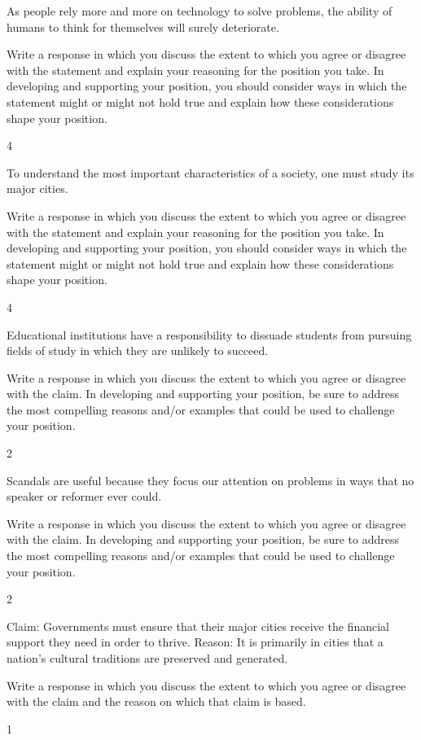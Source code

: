 \documentclass[]{article}
\begin{document}
As people rely more and more on technology to solve problems, the
ability of humans to think for themselves will surely deteriorate.

Write a response in which you discuss the extent to which you agree or
disagree with the statement and explain your reasoning for the position
you take. In developing and supporting your position, you should
consider ways in which the statement might or might not hold true and
explain how these considerations shape your position.

4

To understand the most important characteristics of a society, one must
study its major cities.

Write a response in which you discuss the extent to which you agree or
disagree with the statement and explain your reasoning for the position
you take. In developing and supporting your position, you should
consider ways in which the statement might or might not hold true and
explain how these considerations shape your position.

4

Educational institutions have a responsibility to dissuade students from
pursuing fields of study in which they are unlikely to succeed.

Write a response in which you discuss the extent to which you agree or
disagree with the claim. In developing and supporting your position, be
sure to address the most compelling reasons and/or examples that could
be used to challenge your position.

2

Scandals are useful because they focus our attention on problems in ways
that no speaker or reformer ever could.

Write a response in which you discuss the extent to which you agree or
disagree with the claim. In developing and supporting your position, be
sure to address the most compelling reasons and/or examples that could
be used to challenge your position.

2

Claim: Governments must ensure that their major cities receive the
financial support they need in order to thrive. Reason: It is primarily
in cities that a nation's cultural traditions are preserved and
generated.

Write a response in which you discuss the extent to which you agree or
disagree with the claim and the reason on which that claim is based.

1
\end{document}
